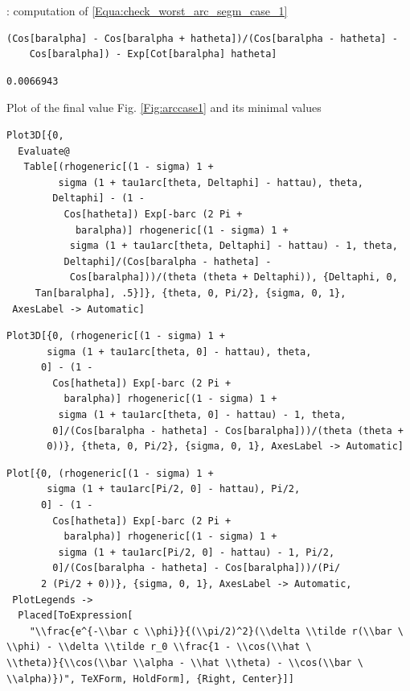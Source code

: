 \documentclass[reqno]{amsart}
\theoremstyle{definition} \newtheorem{definition}{Definition}[section]
\theoremstyle{definition} \newtheorem{remark}[definition]{Remark}
\theoremstyle{plain} \newtheorem{lemma}[definition]{Lemma}
\theoremstyle{plain} \newtheorem{proposition}[definition]{Proposition}
\theoremstyle{plain} \newtheorem{theorem}[definition]{Theorem}
\theoremstyle{plain} \newtheorem{corollary}[definition]{Corollary}
\theoremstyle{definition} \newtheorem{example}[definition]{Example}
\theoremstyle{plain} \newtheorem{claim}[clai]{Claim}
\theoremstyle{definition} \newtheorem{assumption}[definition]{Assumption}
\theoremstyle{definition} \newtheorem{observation}[definition]{Observation}
\newcommand{\1}{\mathbbm 1}
\newcommand{\smed}{\medskip}
\numberwithin{equation}{section} %
\theoremstyle{plain} \newtheorem*{theorem*}{Theorem}
\theoremstyle{plain} \newtheorem{mthm}[maintheorem]{Main Theorem}
\theoremstyle{plain} \newtheorem*{mthm*}{Main Theorem}
\theoremstyle{plain} \newtheorem*{conjecture*}{Conjecture}
\theoremstyle{plain} \newtheorem{conjecture}[definition]{Conjecture}
\theoremstyle{plain} \newtheorem*{problem*}{Problem}
\begin{document}
: computation of \eqref{Equa:check_worst_arc_segm_case_1}
\smed
\begin{verbatim}
(Cos[baralpha] - Cos[baralpha + hatheta])/(Cos[baralpha - hatheta] - 
    Cos[baralpha]) - Exp[Cot[baralpha] hatheta]
\end{verbatim}
\begin{verbatim}
0.0066943
\end{verbatim}
\smed
Plot of the final value Fig. \ref{Fig:arccase1} and its minimal values
\smed
\begin{verbatim}
Plot3D[{0, 
  Evaluate@
   Table[(rhogeneric[(1 - sigma) 1 + 
         sigma (1 + tau1arc[theta, Deltaphi] - hattau), theta, 
        Deltaphi] - (1 - 
          Cos[hatheta]) Exp[-barc (2 Pi + 
            baralpha)] rhogeneric[(1 - sigma) 1 + 
           sigma (1 + tau1arc[theta, Deltaphi] - hattau) - 1, theta, 
          Deltaphi]/(Cos[baralpha - hatheta] - 
           Cos[baralpha]))/(theta (theta + Deltaphi)), {Deltaphi, 0, 
     Tan[baralpha], .5}]}, {theta, 0, Pi/2}, {sigma, 0, 1}, 
 AxesLabel -> Automatic]
\end{verbatim}
\begin{verbatim}
Plot3D[{0, (rhogeneric[(1 - sigma) 1 + 
       sigma (1 + tau1arc[theta, 0] - hattau), theta, 
      0] - (1 - 
        Cos[hatheta]) Exp[-barc (2 Pi + 
          baralpha)] rhogeneric[(1 - sigma) 1 + 
         sigma (1 + tau1arc[theta, 0] - hattau) - 1, theta, 
        0]/(Cos[baralpha - hatheta] - Cos[baralpha]))/(theta (theta + 
       0))}, {theta, 0, Pi/2}, {sigma, 0, 1}, AxesLabel -> Automatic]
\end{verbatim}
\begin{verbatim}
Plot[{0, (rhogeneric[(1 - sigma) 1 + 
       sigma (1 + tau1arc[Pi/2, 0] - hattau), Pi/2, 
      0] - (1 - 
        Cos[hatheta]) Exp[-barc (2 Pi + 
          baralpha)] rhogeneric[(1 - sigma) 1 + 
         sigma (1 + tau1arc[Pi/2, 0] - hattau) - 1, Pi/2, 
        0]/(Cos[baralpha - hatheta] - Cos[baralpha]))/(Pi/
      2 (Pi/2 + 0))}, {sigma, 0, 1}, AxesLabel -> Automatic, 
 PlotLegends -> 
  Placed[ToExpression[
    "\\frac{e^{-\\bar c \\phi}}{(\\pi/2)^2}(\\delta \\tilde r(\\bar \
\\phi) - \\delta \\tilde r_0 \\frac{1 - \\cos(\\hat \
\\theta)}{\\cos(\\bar \\alpha - \\hat \\theta) - \\cos(\\bar \
\\alpha)})", TeXForm, HoldForm], {Right, Center}]]
\end{verbatim}
\end{document}
